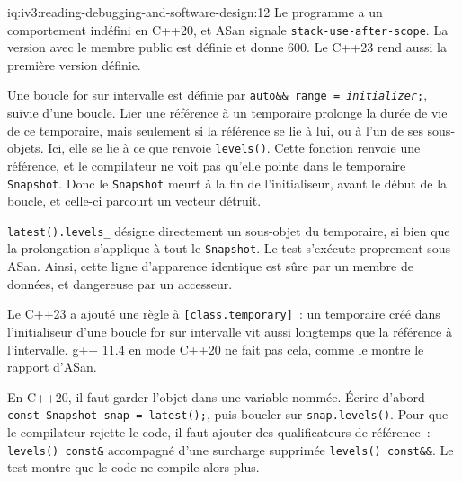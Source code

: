 \begin{solution}{iq:iv3:reading-debugging-and-software-design:12}
Le programme a un comportement indéfini en C++20, et ASan signale \texttt{stack-use-after-scope}. La version avec le membre public est définie et donne 600. Le C++23 rend aussi la première version définie.

Une boucle for sur intervalle est définie par \texttt{auto\&\& range = \textit{initializer};}, suivie d'une boucle. Lier une référence à un temporaire prolonge la durée de vie de ce temporaire, mais seulement si la référence se lie à lui, ou à l'un de ses sous-objets. Ici, elle se lie à ce que renvoie \texttt{levels()}. Cette fonction renvoie une référence, et le compilateur ne voit pas qu'elle pointe dans le temporaire \texttt{Snapshot}. Donc le \texttt{Snapshot} meurt à la fin de l'initialiseur, avant le début de la boucle, et celle-ci parcourt un vecteur détruit.

\texttt{latest().levels\_} désigne directement un sous-objet du temporaire, si bien que la prolongation s'applique à tout le \texttt{Snapshot}. Le test s'exécute proprement sous ASan. Ainsi, cette ligne d'apparence identique est sûre par un membre de données, et dangereuse par un accesseur.

Le C++23 a ajouté une règle à \texttt{[class.temporary]}~: un temporaire créé dans l'initialiseur d'une boucle for sur intervalle vit aussi longtemps que la référence à l'intervalle. g++ 11.4 en mode C++20 ne fait pas cela, comme le montre le rapport d'ASan.

En C++20, il faut garder l'objet dans une variable nommée. Écrire d'abord \texttt{const Snapshot snap = latest();}, puis boucler sur \texttt{snap.levels()}. Pour que le compilateur rejette le code, il faut ajouter des qualificateurs de référence~: \texttt{levels() const\&} accompagné d'une surcharge supprimée \texttt{levels() const\&\&}. Le test montre que le code ne compile alors plus.


\end{solution}

